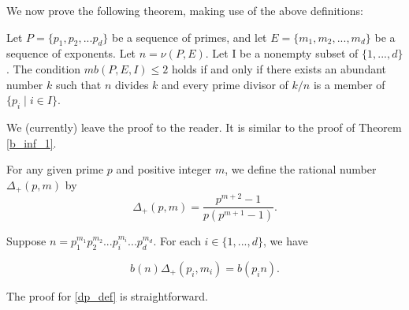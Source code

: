 \documentclass[../paper.tex]{article}
\begin{document}
We now prove the following theorem, making use of the above
definitions:

\begin{theorem}
Let $P = \{p_1, p_2, ... p_d\}$ be a sequence of primes, and let
$E = \{m_1, m_2, ..., m_d\}$ be a sequence of exponents. Let $n =
\nu(P,E)$. Let I be a nonempty subset of $\{1, ..., d\}$. The 
condition $mb(P,E,I) \leq 2$ holds if and only if there exists an 
abundant number $k$ such that $n$ divides $k$ and every prime 
divisor of $k/n$ is a member of $\{p_i \mid i \in I\}$.
\end{theorem}

We (currently) leave the proof to the reader. It is 
similar to the proof of Theorem {\ref{b_inf_1}}.

For any given prime $p$ and positive integer $m$, we define the
rational number $\Delta_+(p,m)$ by
$$\Delta_+(p,m) = \frac{p^{m+2} - 1}{ p (p^{m + 1} -
1)} .$$

\begin{theorem}\label{dp_def}
Suppose $n = p_1^{m_1} p_2^{m_2} ... p_i^{m_i} ... p_d^{m_d}$.
For each $i \in \{1,...,d\}$, we have

$$ b(n) \Delta_+(p_i, m_i) = b(p_i n) .$$
\end{theorem}

The proof for {\ref{dp_def}} is straightforward.
\end{document}
